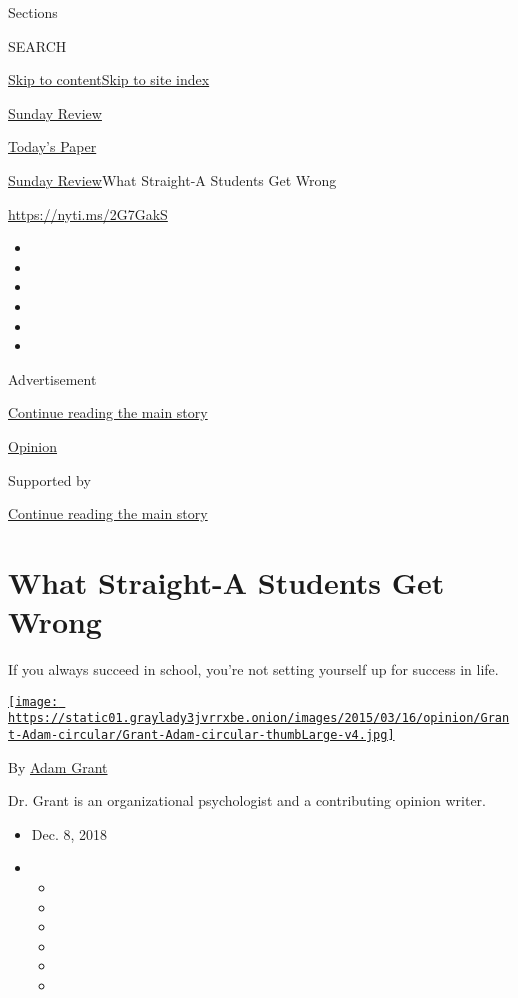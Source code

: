 Sections

SEARCH

\protect\hyperlink{site-content}{Skip to
content}\protect\hyperlink{site-index}{Skip to site index}

\href{https://www.nytimes3xbfgragh.onion/section/opinion/sunday}{Sunday
Review}

\href{https://myaccount.nytimes3xbfgragh.onion/auth/login?response_type=cookie\&client_id=vi}{}

\href{https://www.nytimes3xbfgragh.onion/section/todayspaper}{Today's
Paper}

\href{/section/opinion/sunday}{Sunday Review}\textbar{}What Straight-A
Students Get Wrong

\url{https://nyti.ms/2G7GakS}

\begin{itemize}
\item
\item
\item
\item
\item
\item
\end{itemize}

Advertisement

\protect\hyperlink{after-top}{Continue reading the main story}

\href{/section/opinion}{Opinion}

Supported by

\protect\hyperlink{after-sponsor}{Continue reading the main story}

\hypertarget{what-straight-a-students-get-wrong}{%
\section{What Straight-A Students Get
Wrong}\label{what-straight-a-students-get-wrong}}

If you always succeed in school, you're not setting yourself up for
success in life.

\href{https://www.nytimes3xbfgragh.onion/column/adam-grant}{\texttt{[image: https://static01.graylady3jvrrxbe.onion/images/2015/03/16/opinion/Grant-Adam-circular/Grant-Adam-circular-thumbLarge-v4.jpg]}}

By \href{https://www.nytimes3xbfgragh.onion/column/adam-grant}{Adam
Grant}

Dr. Grant is an organizational psychologist and a contributing opinion
writer.

\begin{itemize}
\item
  Dec. 8, 2018
\item
  \begin{itemize}
  \item
  \item
  \item
  \item
  \item
  \item
  \end{itemize}
\end{itemize}

